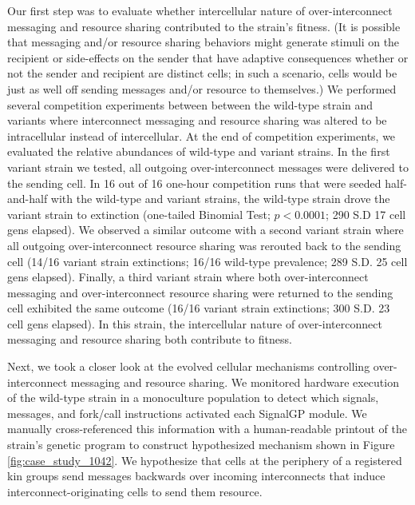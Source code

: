 Our first step was to evaluate whether intercellular nature of over-interconnect messaging and resource sharing contributed to the strain's fitness.
(It is possible that messaging and/or resource sharing behaviors might generate stimuli on the recipient or side-effects on the sender that have adaptive consequences whether or not the sender and recipient are distinct cells;
in such a scenario, cells would be just as well off sending messages and/or resource to themselves.)
We performed several competition experiments between between the wild-type strain and variants where interconnect messaging and resource sharing was altered to be intracellular instead of intercellular.
At the end of competition experiments, we evaluated the relative abundances of wild-type and variant strains.
In the first variant strain we tested, all outgoing over-interconnect messages were delivered to the sending cell.
In 16 out of 16 one-hour competition runs that were seeded half-and-half with the wild-type and variant strains, the wild-type strain drove the variant strain to extinction (one-tailed Binomial Test; $p < 0.0001$; 290 S.D 17 cell gens elapsed).
We observed a similar outcome with a second variant strain where all outgoing over-interconnect resource sharing was rerouted back to the sending cell (14/16 variant strain extinctions; 16/16 wild-type prevalence; 289 S.D. 25 cell gens elapsed).
Finally, a third variant strain where both over-interconnect messaging and over-interconnect resource sharing were returned to the sending cell exhibited the same outcome (16/16 variant strain extinctions; 300 S.D. 23 cell gens elapsed).
In this strain, the intercellular nature of over-interconnect messaging and resource sharing both contribute to fitness.

Next, we took a closer look at the evolved cellular mechanisms controlling over-interconnect messaging and resource sharing.
We monitored hardware execution of the wild-type strain in a monoculture population to detect which signals, messages, and fork/call instructions activated each SignalGP module.
We manually cross-referenced this information with a human-readable printout of the strain's genetic program to construct hypothesized mechanism shown in Figure \ref{fig:case_study_1042}.
We hypothesize that cells at the periphery of a registered kin groups send messages backwards over incoming interconnects that induce interconnect-originating cells to send them resource.


